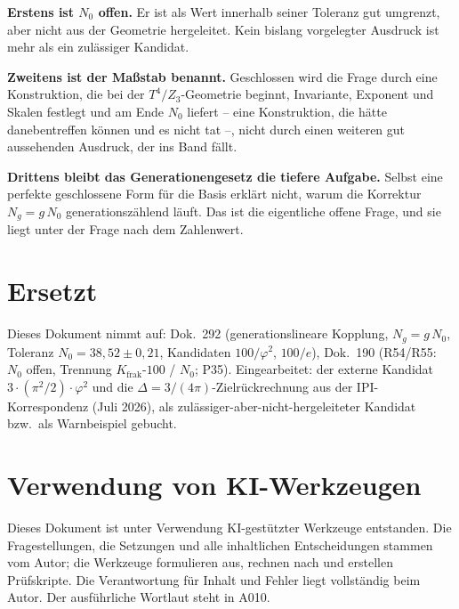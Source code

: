 \textbf{Erstens ist $N_0$ offen.} Er ist als Wert innerhalb seiner Toleranz gut
umgrenzt, aber nicht aus der Geometrie hergeleitet. Kein bislang vorgelegter
Ausdruck ist mehr als ein zulässiger Kandidat.

\textbf{Zweitens ist der Maßstab benannt.} Geschlossen wird die Frage durch eine
Konstruktion, die bei der $T^4/Z_3$-Geometrie beginnt, Invariante, Exponent und
Skalen festlegt und am Ende $N_0$ liefert -- eine Konstruktion, die hätte
danebentreffen können und es nicht tat --, nicht durch einen weiteren gut
aussehenden Ausdruck, der ins Band fällt.

\textbf{Drittens bleibt das Generationengesetz die tiefere Aufgabe.} Selbst eine
perfekte geschlossene Form für die Basis erklärt nicht, warum die Korrektur
$N_g = g\,N_0$ generationszählend läuft. Das ist die eigentliche offene Frage,
und sie liegt unter der Frage nach dem Zahlenwert.

\section{Ersetzt}

Dieses Dokument nimmt auf: Dok.~292 (generationslineare Kopplung, $N_g=g\,N_0$,
Toleranz $N_0=38{,}52\pm0{,}21$, Kandidaten $100/\varphi^2$, $100/e$),
Dok.~190 (R54/R55: $N_0$ offen, Trennung $K_\text{frak}$-$100$ / $N_0$; P35).
Eingearbeitet: der externe Kandidat $3\cdot(\pi^2/2)\cdot\varphi^2$ und die
$\Delta=3/(4\pi)$-Zielrückrechnung aus der IPI-Korrespondenz (Juli 2026), als
zulässiger-aber-nicht-hergeleiteter Kandidat bzw.\ als Warnbeispiel gebucht.

\section{Verwendung von KI-Werkzeugen}

Dieses Dokument ist unter Verwendung KI-gestützter Werkzeuge entstanden. Die
Fragestellungen, die Setzungen und alle inhaltlichen Entscheidungen stammen vom
Autor; die Werkzeuge formulieren aus, rechnen nach und erstellen Prüfskripte.
Die Verantwortung für Inhalt und Fehler liegt vollständig beim Autor. Der
ausführliche Wortlaut steht in A010.
